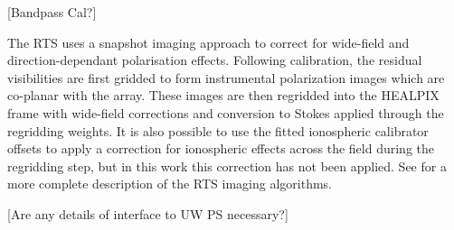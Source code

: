[Bandpass Cal?]

The RTS uses a snapshot imaging approach to correct for wide-field and direction-dependant polarisation effects. Following calibration, the residual visibilities are first gridded to form instrumental polarization images which are co-planar with the array. These images are then regridded into the HEALPIX frame with wide-field corrections and conversion to Stokes applied through the regridding weights. It is also possible to use the fitted ionospheric calibrator offsets to apply a correction for ionospheric effects across the field during the regridding step, but in this work this correction has not been applied. See \citet{Clark_Allen_Arcus_et_al__2010} for a more complete description of the RTS imaging algorithms.

[Are any details of interface to UW PS necessary?]